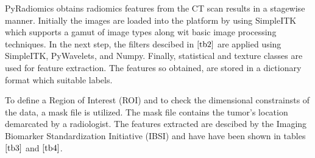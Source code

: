 \documentclass[final,1p,times,twocolumn]{elsarticle}
\begin{document}
PyRadiomics obtains radiomics features from the CT scan results in a stagewise manner. Initially the images are loaded into the platform by using SimpleITK which supports a gamut of image types along wit basic image processing techniques. In the next step, the filters descibed in $\ref{tb2}$ are applied using SimpleITK, PyWavelets, and Numpy. Finally, statistical and texture classes are used for feature extraction. The features so obtained, are stored in a dictionary format which suitable labels. 

To define a Region of Interest (ROI) and to check the dimensional constrainsts of the data, a mask file is utilized. The mask file contains the tumor's location demarcated by a radiologist. The features extracted are descibed by the Imaging Biomarker Standardization Initiative (IBSI) and have have been shown in tables $\ref{tb3}$ and $\ref{tb4}$.

\end{document}
